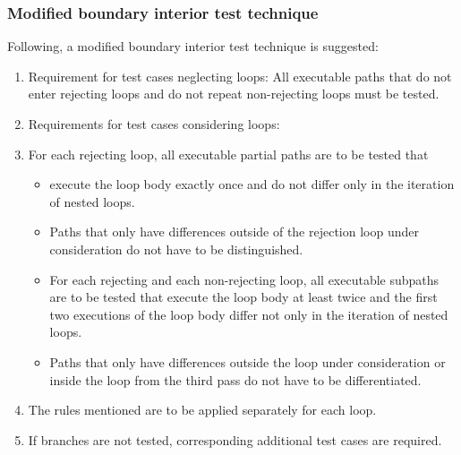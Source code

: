

	\subsubsection{Modified boundary interior test technique}

	Following, a modified boundary interior test technique is suggested:

	\begin{enumerate}
		\item Requirement for test cases neglecting loops: All executable paths that do not enter rejecting loops and do not repeat non-rejecting loops must be tested.
		\item Requirements for test cases considering loops:
		\item For each rejecting loop, all executable partial paths are to be tested that
			\begin{itemize}
				\item execute the loop body exactly once and do not differ only in the iteration of nested loops.
				\item Paths that only have differences outside of the rejection loop under consideration do not have to be distinguished.
			\end{itemize}
			\begin{itemize}
				\item For each rejecting and each non-rejecting loop, all executable subpaths are to be tested that execute the loop body at least twice and the first two executions of the loop body differ not only in the iteration of nested loops.
				\item Paths that only have differences outside the loop under consideration or inside the loop from the third pass do not have to be differentiated.
			\end{itemize}
		\item The rules mentioned are to be applied separately for each loop.
		\item If branches are not tested, corresponding additional test cases are required.
	\end{enumerate}

